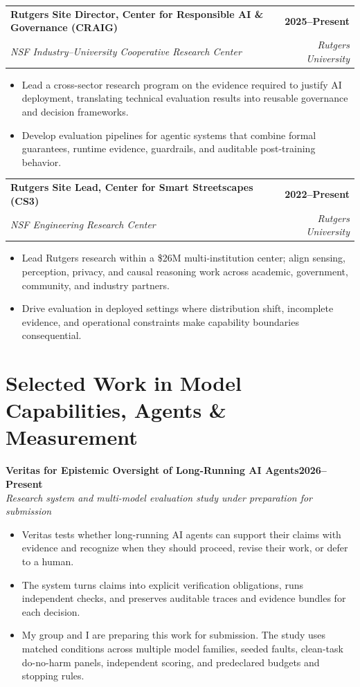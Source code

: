 \documentclass[10pt,letterpaper]{article}
\makeatletter
\newcommand{\role}[4]{%
  \par\noindent
  \begin{tabularx}{\textwidth}{@{}Xr@{}}
    \textbf{\color{ink}#1} & \textbf{\color{muted}#2}\\
    \textit{\color{muted}#3} & \textit{\color{muted}#4}
  \end{tabularx}\par
}
\newcommand{\project}[3]{%
  \par\noindent
  \textbf{\color{ink}#1}\hfill\textbf{\color{muted}#2}\\[-1pt]
  \textit{\color{muted}#3}\par
}
\makeatother
\begin{document}
\role{Rutgers Site Director, Center for Responsible AI \& Governance (CRAIG)}{2025--Present}
{NSF Industry--University Cooperative Research Center}{Rutgers University}
\begin{itemize}
  \item Lead a cross-sector research program on the evidence required to justify AI deployment, translating technical evaluation results into reusable governance and decision frameworks.
  \item Develop evaluation pipelines for agentic systems that combine formal guarantees, runtime evidence, guardrails, and auditable post-training behavior.
\end{itemize}

\role{Rutgers Site Lead, Center for Smart Streetscapes (CS3)}{2022--Present}
{NSF Engineering Research Center}{Rutgers University}
\begin{itemize}
  \item Lead Rutgers research within a \$26M multi-institution center; align sensing, perception, privacy, and causal reasoning work across academic, government, community, and industry partners.
  \item Drive evaluation in deployed settings where distribution shift, incomplete evidence, and operational constraints make capability boundaries consequential.
\end{itemize}

\section{Selected Work in Model Capabilities, Agents \& Measurement}

\project{Veritas for Epistemic Oversight of Long-Running AI Agents}{2026--Present}
{Research system and multi-model evaluation study under preparation for submission}
\begin{itemize}
  \item Veritas tests whether long-running AI agents can support their claims with evidence and recognize when they should proceed, revise their work, or defer to a human.
  \item The system turns claims into explicit verification obligations, runs independent checks, and preserves auditable traces and evidence bundles for each decision.
  \item My group and I are preparing this work for submission. The study uses matched conditions across multiple model families, seeded faults, clean-task do-no-harm panels, independent scoring, and predeclared budgets and stopping rules.
\end{itemize}
\end{document}
